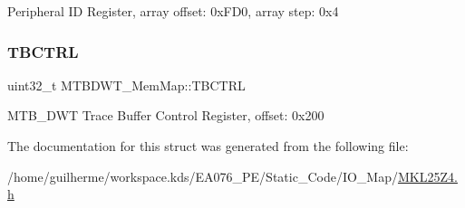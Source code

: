 Peripheral ID Register, array offset\+: 0x\+F\+D0, array step\+: 0x4 \mbox{\label{struct_m_t_b_d_w_t___mem_map_a2d08a9ac507db96efebd284e02f0efe9}} 
\subsubsection{\texorpdfstring{T\+B\+C\+T\+RL}{TBCTRL}}
{\footnotesize\ttfamily uint32\+\_\+t M\+T\+B\+D\+W\+T\+\_\+\+Mem\+Map\+::\+T\+B\+C\+T\+RL}

M\+T\+B\+\_\+\+D\+WT Trace Buffer Control Register, offset\+: 0x200 

The documentation for this struct was generated from the following file\+:\begin{DoxyCompactItemize}
\item 
/home/guilherme/workspace.\+kds/\+E\+A076\+\_\+\+P\+E/\+Static\+\_\+\+Code/\+I\+O\+\_\+\+Map/\hyperlink{_m_k_l25_z4_8h}{M\+K\+L25\+Z4.\+h}\end{DoxyCompactItemize}
